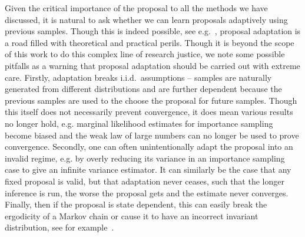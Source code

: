 Given the critical importance of the proposal to all the methods we have discussed,
it is natural to ask whether we can learn proposals adaptively using previous samples.
Though this is indeed possible, see e.g.~\citep{gilks1992adaptive,cappe2004population,cappe2008adaptive,andrieu2008tutorial},
proposal adaptation is a road filled with theoretical and practical perils.  
Though it is beyond the scope of this work to do this complex line of research justice, we note some possible pitfalls 
as a warning that proposal adaptation should be carried out with extreme care.
Firstly, adaptation breaks i.i.d.~assumptions -- samples are naturally generated from different
distributions and are further dependent because the previous samples are used to the choose the
proposal for future samples.  Though this itself does not necessarily prevent convergence, it does mean various
results no longer hold, e.g. marginal likelihood estimates for importance sampling
become biased and the weak law of large numbers can no longer be used to prove convergence.  Secondly,
one can often unintentionally adapt the proposal into an invalid regime, e.g. by overly reducing its variance in
an importance sampling case to give an infinite variance estimator.  It can similarly be the case that
any fixed proposal is valid, but that adaptation never ceases, such that the longer inference is run, the worse the
proposal gets and the estimate never converges.  Finally, then if the
proposal is state dependent, this can easily break the ergodicity of a Markov chain or cause it to
have an incorrect invariant distribution, see for example~\cite[Section 2]{andrieu2008tutorial}.